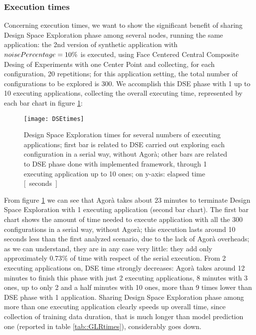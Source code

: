 \subsubsection{Execution times}

Concerning execution times, we want to show the significant benefit of sharing Design Space Exploration phase among several nodes, running the same application: the 2nd version of synthetic application with $noise\-Percentage = 10\%$ is executed, using Face Centered Central Composite Desing of Experiments with one Center Point and collecting, for each configuration, 20 repetitions; for this application setting, the total number of configurations to be explored is 300. We accomplish this DSE phase with 1 up to 10 executing applications, collecting the overall executing time, represented by each bar chart in figure \ref{fig::DSEtimes}:

\begin{figure}[H]

    \centering
    \texttt{[image: DSEtimes]}
    \caption[Design Space Exploration times for several numbers of executing applications]{Design Space Exploration times for several numbers of executing applications; first bar is related to DSE carried out exploring each configuration in a serial way, without Agorà; other bars are related to DSE phase done with implemented framework, through 1 executing application up to 10 ones; on y-axis: elapsed time \hbox{[ seconds ]}}
    \label{fig::DSEtimes}
    
\end{figure}

From figure \ref{fig::DSEtimes} we can see that Agorà takes about 23 minutes to terminate Design Space Exploration with 1 executing application (second bar chart). The first bar chart shows the amount of time needed to execute application with all the 300 configurations in a serial way, without Agorà; this execution lasts around 10 seconds less than the first analyzed scenario, due to the lack of Agorà overheads; as we can understand, they are in any case very little: they add only approximately $0.73\%$ of time with respect of the serial execution. From 2 executing applications on, DSE time strongly decreases: Agorà takes around 12 minutes to finish this phase with just 2 executing applications, 8 minutes with 3 ones, up to only 2 and a half minutes with 10 ones, more than 9 times lower than DSE phase with 1 application. Sharing Design Space Exploration phase among more than one executing application clearly speeds up overall time, since collection of training data duration, that is much longer than model prediction one (reported in table \ref{tab::GLRtimes}), considerably goes down.

